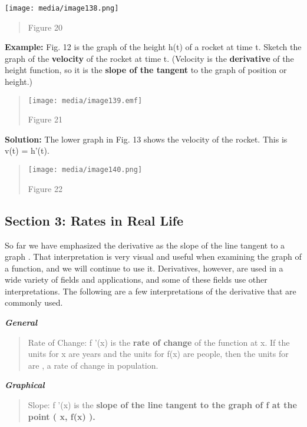 \texttt{[image: media/image138.png]}

\begin{quote}
Figure 20
\end{quote}

\textbf{Example:} Fig. 12 is the graph of the height h(t) of a rocket at
time t. Sketch the graph of the \textbf{velocity} of the rocket at time
t. (Velocity is the \textbf{derivative} of the height function, so it is
the \textbf{slope of the tangent} to the graph of position or height.)

\begin{quote}
\texttt{[image: media/image139.emf]}

Figure 21
\end{quote}

\textbf{Solution:} The lower graph in Fig. 13 shows the velocity of the
rocket. This is v(t) = h'(t).

\begin{quote}
\texttt{[image: media/image140.png]}

Figure 22
\end{quote}

\hypertarget{section-3-rates-in-real-life}{\subsection{Section 3: Rates
in Real Life}\label{section-3-rates-in-real-life}}

So far we have emphasized the derivative as the slope of the line
tangent to a graph . That interpretation is very visual and useful when
examining the graph of a function, and we will continue to use it.
Derivatives, however, are used in a wide variety of fields and
applications, and some of these fields use other interpretations. The
following are a few interpretations of the derivative that are commonly
used.

\textbf{\emph{General}}

\begin{quote}
Rate of Change: f '(x) is the \textbf{rate of change} of the function at
x. If the units for x are years and the units for f(x) are people, then
the units for are , a rate of change in population.
\end{quote}

\textbf{\emph{Graphical}}

\begin{quote}
Slope: f '(x) is the \textbf{slope of the line tangent to the graph of f
at the point ( x, f(x) ).}
\end{quote}

